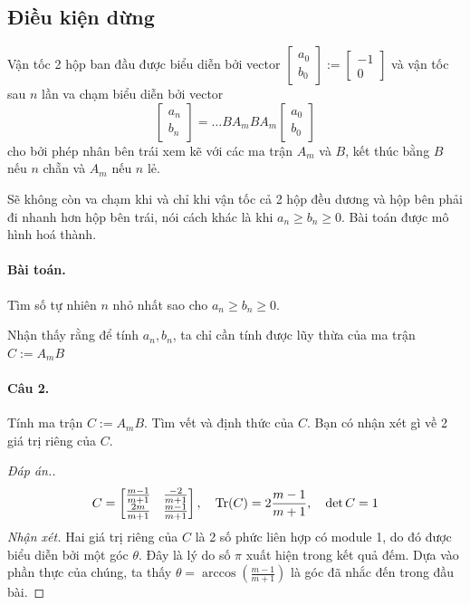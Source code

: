 \documentclass[11pt]{article}
\newcommand{\tr}{\mathop{\rm Tr}\nolimits}
\begin{document}
\subsection*{Điều kiện dừng}
\label{sec:orgd0dc201}
Vận tốc 2 hộp ban đầu được biểu diễn bởi vector \(\begin{bmatrix} a_0\\b_0 \end{bmatrix}
:= \begin{bmatrix} -1\\0 \end{bmatrix}\) và vận tốc sau \(n\) lần va chạm biểu diễn bởi
vector
\begin{equation*}
 \begin{bmatrix} a_n\\b_n \end{bmatrix} = \dots B A_m B A_m \begin{bmatrix} a_0\\b_0 \end{bmatrix}
\end{equation*}
cho bởi phép nhân bên trái xem kẽ với các ma trận \(A_m\) và \(B\), kết thúc bằng \(B\) nếu \(n\) chẵn và \(A_m\) nếu \(n\) lẻ.

Sẽ không còn va chạm khi và chỉ khi vận tốc cả 2 hộp đều dương và hộp bên phải đi nhanh
hơn hộp bên trái, nói cách khác là khi \(a_n\geq b_n\geq 0\). Bài toán được mô hình hoá
thành.

\paragraph*{Bài toán.}
\label{sec:org8b375c5}
Tìm số tự nhiên \(n\) nhỏ nhất sao cho \(a_n\geq b_n \geq 0\).

Nhận thấy rằng để tính \(a_n, b_n\), ta chỉ cần tính được lũy thừa của ma trận \(C :=A_m B\)

\paragraph{Câu 2.}
\label{sec:org7a31879}
Tính ma trận \(C := A_m B\). Tìm vết và định thức của \(C\). Bạn có nhận xét gì về 2
giá trị riêng của \(C\). 


\begin{proof}[Đáp án.]
\[
 C = \begin{bmatrix} \frac{m-1}{m+1} & \frac{-2}{m+1}\\ \frac{2m}{m+1} &
 \frac{m-1}{m+1} \end{bmatrix},\quad \tr(C) = 2\frac{m-1}{m+1},\quad \det C = 1
\]
\emph{Nhận xét.} Hai giá trị riêng của \(C\) là 2 số phức liên hợp có module 1, do đó được biểu diễn bởi
 một góc \(\theta\). Đây là lý do số
 \(\pi\) xuất hiện trong kết quả đếm. Dựa vào phần thực của chúng, ta thấy \(\theta =
 \arccos(\frac{m-1}{m+1})\) là góc đã nhắc đến trong đầu bài.
\end{proof}
\end{document}
